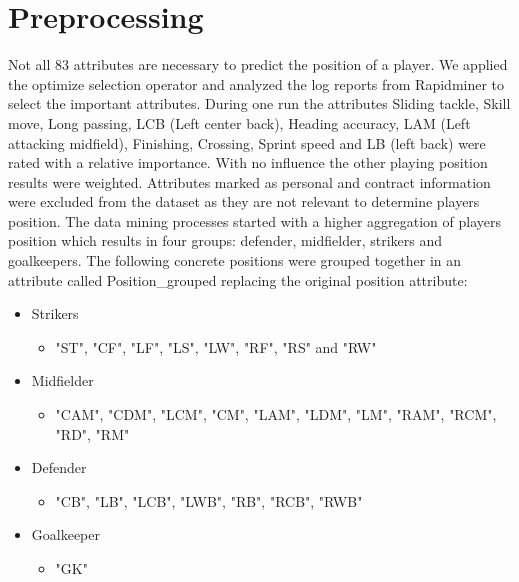 \section{Preprocessing}

Not all 83 attributes are necessary to predict the position of a player.
We applied the optimize selection operator and analyzed the log reports from Rapidminer to select the important attributes.
During one run the attributes Sliding tackle, Skill move, Long passing, LCB (Left center back), Heading accuracy, LAM (Left attacking midfield), Finishing, Crossing, Sprint speed and LB (left back) were rated with a relative importance. With no influence the other playing position results were weighted. \newline
Attributes marked as personal and contract information were excluded from the dataset as they are not relevant to determine players position. 
The data mining processes started with a higher aggregation of players position which results in four groups: defender, midfielder, strikers and goalkeepers. The following concrete positions were grouped together in an attribute called Position\_grouped replacing the original position attribute:
\begin{itemize} 
\item Strikers
\begin{itemize}
\item "ST", "CF", "LF", "LS", "LW", "RF", "RS" and "RW"
\end{itemize}
\item Midfielder
\begin{itemize}
\item "CAM", "CDM", "LCM", "CM", "LAM", "LDM", "LM", "RAM", "RCM", "RD", "RM"
\end{itemize}
\item Defender
\begin{itemize} 
\item "CB", "LB", "LCB", "LWB", "RB", "RCB", "RWB"
\end{itemize}
\item Goalkeeper
\begin{itemize}
\item "GK"
\end{itemize}
\end{itemize}